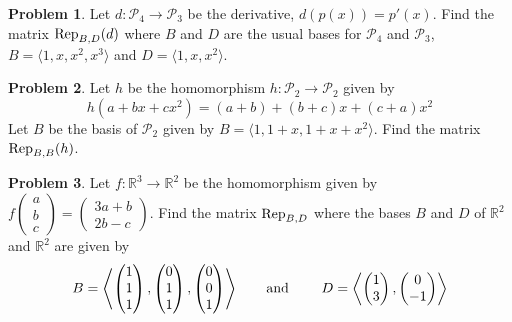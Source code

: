 \documentclass[11pt]{article}
\newcommand{\R}{{\mathbb R}}
\theoremstyle{definition}
\newtheorem{problem}{Problem}
\newenvironment{answer}{\par\bigskip\bgroup\color{darkblue}}{\egroup}
\begin{document}
\begin{answer}
\end{answer}




\begin{problem}
Let $d\colon {\mathscr P}_4 \to {\mathscr P}_3$ be the derivative,
$d(p(x)) = p'(x)$.  Find the matrix ${\rm Rep}_{B,D}(d)$ where $B$ and $D$
are the usual bases for ${\mathscr P}_4$ and ${\mathscr P}_3$,
$B=\langle 1,x,x^2,x^3 \rangle$ and $D=\langle 1,x,x^2 \rangle$.
\end{problem}

\begin{answer}
\end{answer}




\begin{problem}
Let $h$ be the homomorphism $h\colon {\mathscr P}_2 \to {\mathscr P}_2$ given by
$$h(a+bx+cx^2) = (a+b) + (b+c)x + (c+a)x^2$$
Let $B$ be the basis of $\mathscr P_2$ given by $B=\langle 1, 1+x, 1+x+x^2\rangle$.
Find the matrix ${\rm Rep}_{B,B}(h)$.
\end{problem}

\begin{answer}
\end{answer}




\begin{problem}
Let $f\colon \R^3\to\R^2$ be the homomorphism given by $f\begin{pmatrix}a\\b\\c\end{pmatrix}=
\begin{pmatrix} 3a+b\\2b-c\end{pmatrix}$.  Find the matrix ${\rm Rep}_{B,D}$ where the bases
$B$ and $D$ of $\R^2$ and $\R^2$ are given by
$$B=\left\langle
    \begin{pmatrix} 1\\1\\1 \end{pmatrix},
    \begin{pmatrix} 0\\1\\1 \end{pmatrix},
    \begin{pmatrix} 0\\0\\1 \end{pmatrix}
  \right\rangle \mbox{\qquad and \qquad}
 D=\left\langle
    \begin{pmatrix} 1\\3 \end{pmatrix}, 
    \begin{pmatrix} 0\\-1 \end{pmatrix}
 \right\rangle$$
\end{problem}
\end{document}
